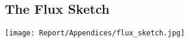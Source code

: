 \begin{appendices}


\section{The Flux Sketch}
\texttt{[image: Report/Appendices/flux\_sketch.jpg]}
\label{appx: Flux Sketch}



\end{appendices}
